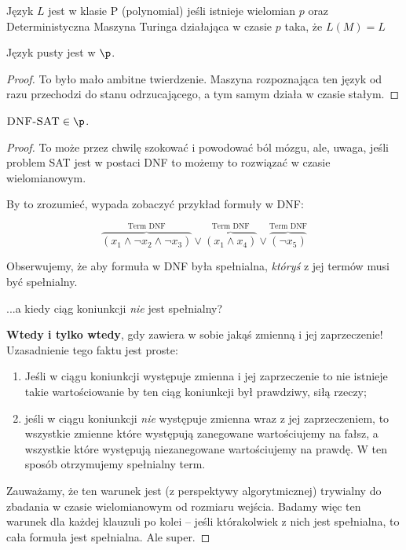 \begin{definition}
    Język \( L \) jest w klasie P (polynomial) jeśli istnieje wielomian \( p \)
    oraz Deterministyczna Maszyna Turinga działająca w czasie \( p \) taka, że \( L(M) = L \)
\end{definition}

\begin{theorem}
Język pusty jest w \(\p\). 
\end{theorem}
\begin{proof}
To było mało ambitne twierdzenie. Maszyna rozpoznająca ten język od razu przechodzi do stanu odrzucającego, a tym samym działa w czasie stałym.
\end{proof}

\begin{theorem}
\( \textsc{DNF-SAT} \in \p \).
\end{theorem}
\begin{proof}
To może przez chwilę szokować i powodować ból mózgu, ale, uwaga, jeśli problem \textsc{SAT} jest w postaci \textsc{DNF} to możemy to rozwiązać w czasie wielomianowym.

By to zrozumieć, wypada zobaczyć przykład formuły w \textsc{DNF}:

\[ 
            \overbrace{(x_1 \land \neg x_2 \land \neg x_3)}^{\text{Term DNF}} \lor \overbrace{(x_1 \land x_4)}^{\text{Term DNF}} \lor \overbrace{(\neg x_5)}^{\text{Term DNF}}    
\] 

Obserwujemy, że aby formuła w \textsc{DNF} była spełnialna, \textit{któryś} z jej termów musi być spełnialny. 

...a kiedy ciąg koniunkcji \textit{nie} jest spełnialny?

\textbf{Wtedy i tylko wtedy}, gdy zawiera w sobie jakąś zmienną i jej zaprzeczenie! Uzasadnienie tego faktu jest proste:

\begin{enumerate}
    \item Jeśli w ciągu koniunkcji występuje zmienna i jej zaprzeczenie to nie istnieje takie wartościowanie by ten ciąg koniunkcji był prawdziwy, siłą rzeczy;
    \item jeśli w ciągu koniunkcji \textit{nie} występuje zmienna wraz z jej zaprzeczeniem, to wszystkie zmienne które występują zanegowane wartościujemy na fałsz, a wszystkie które występują niezanegowane wartościujemy na prawdę. W ten sposób otrzymujemy spełnialny term. 
\end{enumerate}

Zauważamy, że ten warunek jest (z perspektywy algorytmicznej) trywialny do zbadania w czasie wielomianowym od rozmiaru wejścia. Badamy więc ten warunek dla każdej klauzuli po kolei -- jeśli którakolwiek z nich jest spełnialna, to cała formuła jest spełnialna. Ale super. 

\end{proof}

